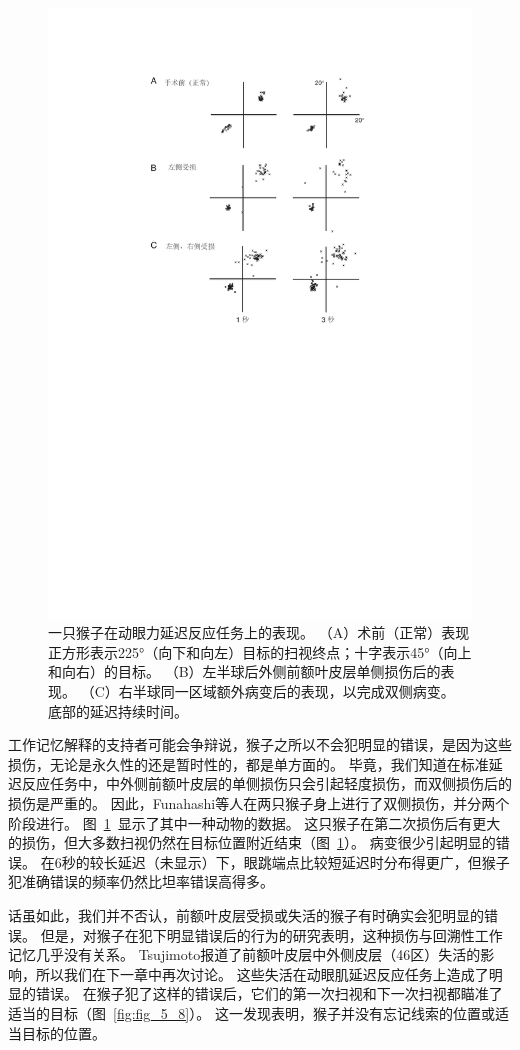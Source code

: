 \begin{figure}
	\centering
	\includegraphics[width=0.67\linewidth]{chap5/Fig_5_7}
	\caption{一只猴子在动眼力延迟反应任务上的表现。
		（A）术前（正常）表现正方形表示225°（向下和向左）目标的扫视终点；十字表示45°（向上和向右）的目标。
		（B）左半球后外侧前额叶皮层单侧损伤后的表现。
		（C）右半球同一区域额外病变后的表现，以完成双侧病变。
		底部的延迟持续时间\cite{funahashi1993dorsolateral}。}
	\label{fig:fig_5_7}
\end{figure}


工作记忆解释的支持者可能会争辩说，猴子之所以不会犯明显的错误，是因为这些损伤，无论是永久性的还是暂时性的，都是单方面的。
毕竟，我们知道在标准延迟反应任务中，中外侧前额叶皮层的单侧损伤只会引起轻度损伤\cite{rosen1975effects}，而双侧损伤后的损伤是严重的\cite{goldman1971analysis}。
因此，Funahashi等人\cite{funahashi1993dorsolateral}在两只猴子身上进行了双侧损伤，并分两个阶段进行。
图~\ref{fig:fig_5_7}~显示了其中一种动物的数据。
这只猴子在第二次损伤后有更大的损伤，但大多数扫视仍然在目标位置附近结束（图~\ref{fig:fig_5_7}）。
病变很少引起明显的错误。
在6秒的较长延迟（未显示）下，眼跳端点比较短延迟时分布得更广，但猴子犯准确错误的频率仍然比坦率错误高得多。


话虽如此，我们并不否认，前额叶皮层受损或失活的猴子有时确实会犯明显的错误。
但是，对猴子在犯下明显错误后的行为的研究表明，这种损伤与回溯性工作记忆几乎没有关系。
Tsujimoto\cite{tsujimoto2012prefrontal}报道了前额叶皮层中外侧皮层（46区）失活的影响，所以我们在下一章中再次讨论。
这些失活在动眼肌延迟反应任务上造成了明显的错误。
在猴子犯了这样的错误后，它们的第一次扫视和下一次扫视都瞄准了适当的目标（图~\ref{fig:fig_5_8}）。
这一发现表明，猴子并没有忘记线索的位置或适当目标的位置。


